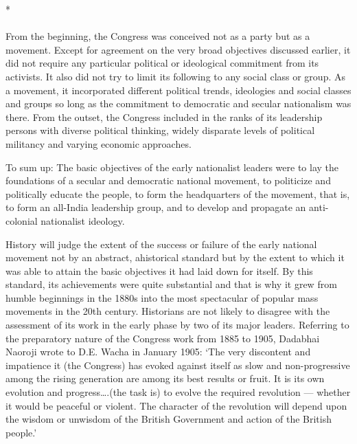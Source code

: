 \begin{center}*\end{center}

\paragraph*{}


From the beginning, the Congress was conceived not as a party but as a movement. Except for agreement on the very broad objectives discussed earlier, it did not require any particular political or ideological commitment from its activists. It also did not try to limit its following to any social class or group. As a movement, it incorporated different political trends, ideologies and social classes and groups so long as the commitment to democratic and secular nationalism was there. From the outset, the Congress included in the ranks of its leadership persons with diverse political thinking, widely disparate levels of political militancy and varying economic approaches.

To sum up: The basic objectives of the early nationalist leaders were to lay the foundations of a secular and democratic national movement, to politicize and politically educate the people, to form the headquarters of the movement, that is, to form an all-India leadership group, and to develop and propagate an anti-colonial nationalist ideology.

History will judge the extent of the success or failure of the early national movement not by an abstract, ahistorical standard but by the extent to which it was able to attain the basic objectives it had laid down for itself. By this standard, its achievements were quite substantial and that is why it grew from humble beginnings in the 1880s into the most spectacular of popular mass movements in the 20th century. Historians are not likely to disagree with the assessment of its work in the early phase by two of its major leaders. Referring to the preparatory nature of the Congress work from 1885 to 1905, Dadabhai Naoroji wrote to D.E. Wacha in January 1905: `The very discontent and impatience it (the Congress) has evoked against itself as slow and non-progressive among the rising generation are among its best results or fruit. It is its own evolution and progress….(the task is) to evolve the required revolution — whether it would be peaceful or violent. The character of the revolution will depend upon the wisdom or unwisdom of the British Government and action of the British people.'

